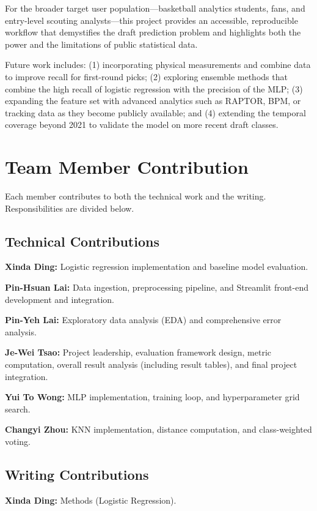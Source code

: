 For the broader target user population---basketball analytics students, fans, and entry-level scouting analysts---this project provides an accessible, reproducible workflow that demystifies the draft prediction problem and highlights both the power and the limitations of public statistical data.

Future work includes: (1) incorporating physical measurements and combine data to improve recall for first-round picks; (2) exploring ensemble methods that combine the high recall of logistic regression with the precision of the MLP; (3) expanding the feature set with advanced analytics such as RAPTOR, BPM, or tracking data as they become publicly available; and (4) extending the temporal coverage beyond 2021 to validate the model on more recent draft classes.


\section{Team Member Contribution}

Each member contributes to both the technical work and the writing. Responsibilities are divided below.

\subsection{Technical Contributions}

\textbf{Xinda Ding:} Logistic regression implementation and baseline model evaluation.

\textbf{Pin-Hsuan Lai:} Data ingestion, preprocessing pipeline, and Streamlit front-end development and integration.

\textbf{Pin-Yeh Lai:} Exploratory data analysis (EDA) and comprehensive error analysis.

\textbf{Je-Wei Tsao:} Project leadership, evaluation framework design, metric computation, overall result analysis (including result tables), and final project integration.

\textbf{Yui To Wong:} MLP implementation, training loop, and hyperparameter grid search.

\textbf{Changyi Zhou:} KNN implementation, distance computation, and class-weighted voting.

\subsection{Writing Contributions}

\textbf{Xinda Ding:} Methods (Logistic Regression).

